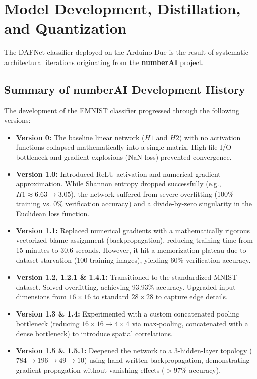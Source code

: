 \documentclass[12pt,a4paper]{article}
\begin{document}
\section{Model Development, Distillation, and Quantization}
The DAFNet classifier deployed on the Arduino Due is the result of systematic architectural iterations originating from the \textbf{numberAI} project. 

\subsection{Summary of numberAI Development History}
The development of the EMNIST classifier progressed through the following versions:
\begin{itemize}
    \item \textbf{Version 0:} The baseline linear network ($H1$ and $H2$) with no activation functions collapsed mathematically into a single matrix. High file I/O bottleneck and gradient explosions (NaN loss) prevented convergence.
    \item \textbf{Version 1.0:} Introduced ReLU activation and numerical gradient approximation. While Shannon entropy dropped successfully (e.g., $H1 \approx 6.63 \to 3.05$), the network suffered from severe overfitting (100\% training vs. 0\% verification accuracy) and a divide-by-zero singularity in the Euclidean loss function.
    \item \textbf{Version 1.1:} Replaced numerical gradients with a mathematically rigorous vectorized blame assignment (backpropagation), reducing training time from 15 minutes to 30.6 seconds. However, it hit a memorization plateau due to dataset starvation (100 training images), yielding 60\% verification accuracy.
    \item \textbf{Version 1.2, 1.2.1 \& 1.4.1:} Transitioned to the standardized MNIST dataset. Solved overfitting, achieving 93.93\% accuracy. Upgraded input dimensions from $16 \times 16$ to standard $28 \times 28$ to capture edge details.
    \item \textbf{Version 1.3 \& 1.4:} Experimented with a custom concatenated pooling bottleneck (reducing $16 \times 16 \to 4 \times 4$ via max-pooling, concatenated with a dense bottleneck) to introduce spatial correlations.
    \item \textbf{Version 1.5 \& 1.5.1:} Deepened the network to a 3-hidden-layer topology ($784 \to 196 \to 49 \to 10$) using hand-written backpropagation, demonstrating gradient propagation without vanishing effects ($>97\%$ accuracy).

\end{itemize}
\end{document}
